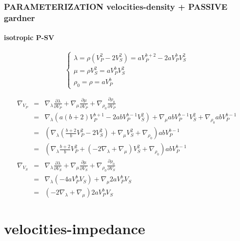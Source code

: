 \documentclass[9pt]{beamer}
\newcommand{\partderi}[2]{\frac{\partial#1}{\partial#2}}
\begin{document}
\begin{frame}\frametitle{PARAMETERIZATION velocities-density  + PASSIVE gardner}
\framesubtitle{isotropic P-SV}

  \begin{center}
  \end{center}
  
  \begin{minipage}{\linewidth}
    \[\left\{ \begin{array}{l}
      \lambda = \rho (V_P^2-2V_S^2) = a V_P^{b+2} - 2a V_P^{b} V_S^2 \\
      \mu    = \rho V_S^2 = a V_P ^{b}V_S^2 \\
      \rho_0 = \rho = a V_P ^{b}
    \end{array} \right.\]
    
    \begin{eqnarray}
      \nabla_{V_P} &=& \nabla_\lambda \partderi{\lambda}{V_P} + \nabla_\mu \partderi{\mu}{V_P} + \nabla_{\rho_0} \partderi{\rho_0}{V_P} \nonumber\\
                   &=& \nabla_\lambda \left( a(b+2)V_P^{b+1} - 2abV_P^{b-1}V_S^2\right) + \nabla_\mu     abV_P^{b-1}V_S^2 + \nabla_{\rho_0} abV_P^{b-1} \nonumber\\
                   &=& \left( \nabla_\lambda \left( \frac{b+2}{b}V_P^2 - 2V_S^2 \right) + \nabla_\mu V_S^2 + \nabla_{\rho_0} \right)abV_P^{b-1} \nonumber\\
                   &=& \left( \nabla_\lambda \frac{b+2}{b}V_P^2 + (-2\nabla_\lambda + \nabla_\mu) V_S^2 + \nabla_{\rho_0} \right)abV_P^{b-1} \nonumber\\
      \nabla_{V_S} &=& \nabla_\lambda \partderi{\lambda}{V_S} + \nabla_\mu \partderi{\mu}{V_S} + \nabla_{\rho_0} \partderi{\rho_0}{V_S} \nonumber\\
                   &=& \nabla_\lambda (-4a V_P^{b}V_S) + \nabla_\mu 2aV_P^{b}V_S \nonumber\\
                   &=& \left(-2\nabla_\lambda + \nabla_\mu \right)2aV_P^{b}V_S \nonumber
    \end{eqnarray}

  \end{minipage}
  
\end{frame}


\section{velocities-impedance}
\end{document}
